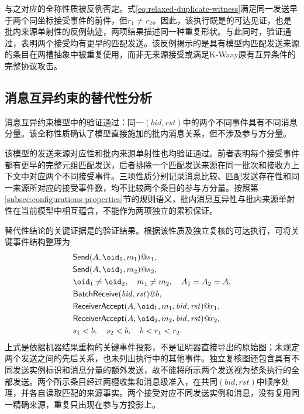 与之对应的全称性质被反例否定。式\eqref{eq:relaxed-duplicate-witness}满足同一发送早于两个同坐标接受事件的前件，但$r_1\neq r_2$。因此，该执行既是的可达见证，也是批内来源单射性的反例轨迹，两项结果描述同一种重复形状。与此同时，验证通过，表明两个接受均有更早的匹配发送。该反例揭示的是具有模型内匹配发送来源的条目在两槽抽象中被重复使用，而非无来源接受或满足K-Waay原有互异条件的完整协议攻击。

\subsection{消息互异约束的替代性分析}
\label{subsec:message-results}

消息互异约束模型中的验证通过：同一$(\mathit{bid},\mathit{rst})$中的两个不同\receiveraccept 事件具有不同消息分量。该全称性质确认了模型直接施加的批内消息关系，但不涉及参与方分量。

该模型的发送来源对应性和批内来源单射性也均验证通过。前者表明每个接受事件都有更早的完整元组匹配发送，后者排除一个匹配发送来源在同一批次和接收方上下文中对应两个不同接受事件。三项性质分别记录消息比较、匹配发送存在性和同一来源所对应的接受事件数，均不比较两个条目的参与方分量。按照第\ref{subsec:configurations-properties}节的规则语义，批内消息互异性与批内来源单射性在当前模型中相互蕴含，不能作为两项独立的累积保证。

替代性结论的关键证据是的验证结果。根据该性质及独立复核的可达执行，可将关键事件结构整理为
\[
  \begin{aligned}
    &\mathsf{Send}(A,\oid_1,m_1)@s_1,\\
    &\mathsf{Send}(A,\oid_2,m_2)@s_2,\\
    &\oid_1\neq\oid_2,\quad m_1\neq m_2,\quad A_1=A_2=A,\\
    &\mathsf{BatchReceive}(\mathit{bid},\mathit{rst})@b,\\
    &\mathsf{ReceiverAccept}(A,\oid_1,m_1,\mathit{bid},\mathit{rst})@r_1,\\
    &\mathsf{ReceiverAccept}(A,\oid_2,m_2,\mathit{bid},\mathit{rst})@r_2,\\
    &s_1<b,\quad s_2<b,\quad b<r_1<r_2.
  \end{aligned}
\]
上式是依据机器结果重构的关键事件投影，不是证明器直接导出的原始图；未规定两个发送之间的先后关系，也未列出执行中的其他事件。独立复核图还包含具有不同发送实例标识和消息分量的额外发送，故不能将所示两个发送视为整条执行的全部发送。两个所示条目经过两槽收集和消息级准入，在共同$(\mathit{bid},\mathit{rst})$中顺序处理，并各自读取匹配的来源事实。两个接受对应不同发送实例和消息，没有复用同一精确来源，重复只出现在参与方投影上。

